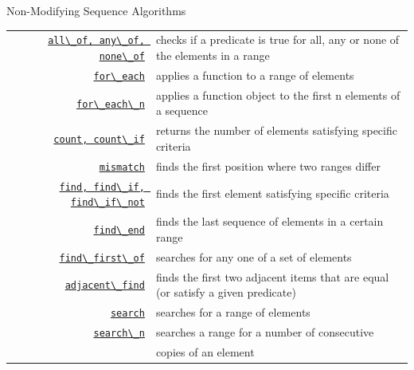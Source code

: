 \documentclass[14pt,aspectratio=1610]{beamer}
\begin{document}
\begin{frame}{Non-Modifying Sequence Algorithms}
\footnotesize\renewcommand{\ULdepth}{3pt}\renewcommand{\arraystretch}{1.2}
\begin{tabularx}{\textwidth}{r X}

\href{https://en.cppreference.com/w/cpp/algorithm/all_any_none_of}{\lstinline{all\_of, any\_of, none\_of}}
 &    checks if a predicate is true for all, any or none of the elements in a range \\
\href{https://en.cppreference.com/w/cpp/algorithm/for_each}{\lstinline{for\_each}}
 &    applies a function to a range of elements \\
\href{https://en.cppreference.com/w/cpp/algorithm/for_each_n}{\lstinline{for\_each\_n}}
 &    applies a function object to the first n elements of a sequence  \\
\href{https://en.cppreference.com/w/cpp/algorithm/count}{\lstinline{count, count\_if}}
 &    returns the number of elements satisfying specific criteria  \\
\href{https://en.cppreference.com/w/cpp/algorithm/mismatch}{\lstinline{mismatch}}
 &    finds the first position where two ranges differ \\
\href{https://en.cppreference.com/w/cpp/algorithm/find}{\lstinline{find, find\_if, find\_if\_not}}
 &    finds the first element satisfying specific criteria  \\
\href{https://en.cppreference.com/w/cpp/algorithm/find_end}{\lstinline{find\_end}}
 &    finds the last sequence of elements in a certain range \\
\href{https://en.cppreference.com/w/cpp/algorithm/find_first_of}{\lstinline{find\_first\_of}}
 &    searches for any one of a set of elements  \\
\href{https://en.cppreference.com/w/cpp/algorithm/adjacent_find}{\lstinline{adjacent\_find}}
 &    finds the first two adjacent items that are equal (or satisfy a given predicate)  \\
\href{https://en.cppreference.com/w/cpp/algorithm/search}{\lstinline{search}}
 &    searches for a range of elements \\
\href{https://en.cppreference.com/w/cpp/algorithm/search_n}{\lstinline{search\_n}}
 &    searches a range for a number of consecutive\\[-0.2em]
 &    copies of an element \\
\end{tabularx}
\end{frame}
\end{document}
